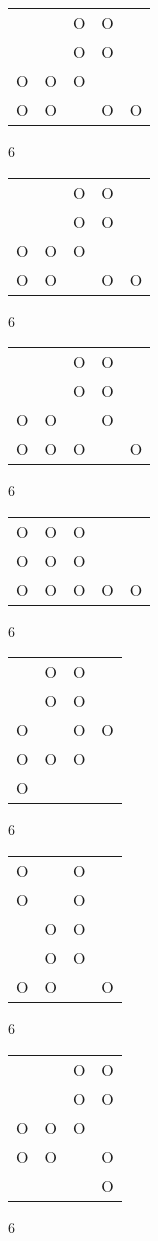 \begin{tabular}{|m{0.2cm}m{0.2cm}m{0.2cm}m{0.2cm}m{0.2cm}|}\hline
 & &O&O& \\
 & &O&O& \\
O&O&O& & \\
O&O& &O&O\\
\hline\end{tabular}6
\begin{tabular}{|m{0.2cm}m{0.2cm}m{0.2cm}m{0.2cm}m{0.2cm}|}\hline
 & &O&O& \\
 & &O&O& \\
O&O&O& & \\
O&O& &O&O\\
\hline\end{tabular}6
\begin{tabular}{|m{0.2cm}m{0.2cm}m{0.2cm}m{0.2cm}m{0.2cm}|}\hline
 & &O&O& \\
 & &O&O& \\
O&O& &O& \\
O&O&O& &O\\
\hline\end{tabular}6
\begin{tabular}{|m{0.2cm}m{0.2cm}m{0.2cm}m{0.2cm}m{0.2cm}|}\hline
O&O&O& & \\
O&O&O& & \\
O&O&O&O&O\\
\hline\end{tabular}6
\begin{tabular}{|m{0.2cm}m{0.2cm}m{0.2cm}m{0.2cm}|}\hline
 &O&O& \\
 &O&O& \\
O& &O&O\\
O&O&O& \\
O& & & \\
\hline\end{tabular}6
\begin{tabular}{|m{0.2cm}m{0.2cm}m{0.2cm}m{0.2cm}|}\hline
O& &O& \\
O& &O& \\
 &O&O& \\
 &O&O& \\
O&O& &O\\
\hline\end{tabular}6
\begin{tabular}{|m{0.2cm}m{0.2cm}m{0.2cm}m{0.2cm}|}\hline
 & &O&O\\
 & &O&O\\
O&O&O& \\
O&O& &O\\
 & & &O\\
\hline\end{tabular}6
